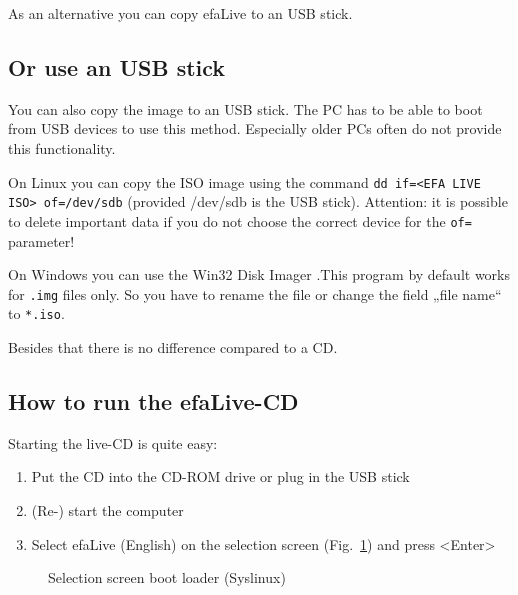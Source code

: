 \documentclass[a4paper,12pt,twoside]{article}
\begin{document}
As an alternative you can copy efaLive to an USB stick.


\subsection{Or use an USB stick}
\label{sct:usb_stick}
You can also copy the image to an USB stick. The
PC has to be able to boot from USB devices to use this method.
Especially older PCs often do not provide this functionality.

On Linux you can copy the ISO image using the command \texttt{dd
if={\textless}EFA LIVE ISO{\textgreater} of=/dev/sdb}
(provided /dev/sdb is the USB stick). Attention: it is possible to
delete important data if you do not choose the correct device for the
\texttt{of=} parameter!

On Windows you can use the Win32 Disk Imager \cite{IMG1}.This program by
default works for \texttt{.img} files only. So you
have to rename the file or change the field „file name“ to
\texttt{*.iso}.

Besides that there is no difference compared to a CD.


\subsection{How to run the efaLive-CD}
\label{sct:live_run}
Starting the live-CD is quite easy:

\begin{enumerate}
    \item Put the CD into the CD-ROM drive or plug in the USB stick
    \item (Re-) start the computer
    \item Select efaLive (English) on the selection screen
(Fig.~\ref{fig:syslinux}) and press {\textless}Enter{\textgreater}
\end{enumerate}

\begin{figure}
    \centering
    \caption{Selection screen boot loader (Syslinux)}
    \label{fig:syslinux}
\end{figure}
\end{document}
